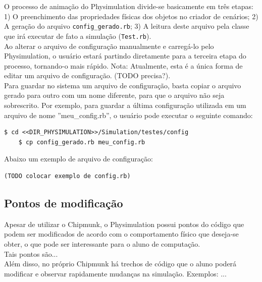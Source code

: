 O processo de animação do Physimulation divide-se basicamente em três etapas: 1) O preenchimento das propriedades físicas dos objetos no criador de cenários; 2) A geração do arquivo {\tt config\_gerado.rb}; 3) A leitura deste arquivo pela classe que irá executar de fato a simulação ({\tt Test.rb}). \\

Ao alterar o arquivo de configuração manualmente e carregá-lo pelo Physimulation, o usuário estará partindo diretamente para a terceira etapa do processo, tornando-o mais rápido.
Nota: Atualmente, esta é a única forma de editar um arquivo de configuração. (TODO precisa?). \\

Para guardar no sistema um arquivo de configuração, basta copiar o arquivo gerado para outro com um nome diferente, para que o arquivo não seja sobrescrito. Por exemplo, para guardar a última configuração utilizada em um arquivo de nome ''meu\_config.rb'', o usuário pode executar o seguinte comando:

\begin{Verbatim}[fontsize=\footnotesize]
	$ cd <<DIR_PHYSIMULATION>>/Simulation/testes/config
	$ cp config_gerado.rb meu_config.rb
\end{Verbatim}

Abaixo um exemplo de arquivo de configuração:

\begin{Verbatim}
(TODO colocar exemplo de config.rb)
\end{Verbatim}

\subsection{Pontos de modificação}
Apesar de utilizar o Chipmunk, o Physimulation possui pontos do código que podem ser modificados de acordo com o comportamento físico que deseja-se obter, o que pode ser interessante para o aluno de computação. \\

Tais pontos são... \\

Além disso, no próprio Chipmunk há trechos de código que o aluno poderá modificar e observar rapidamente mudanças na simulação. Exemplos: ...



